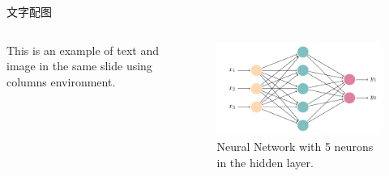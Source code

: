 \documentclass{ctexbeamer}
\begin{document}
\begin{frame}{文字配图}
  \begin{columns}
    \centering
    This is an example of text and image in the same slide using columns environment.
    \begin{figure}
      \centering
      \includegraphics[width=\textwidth]{neural-networks.pdf}
      \caption{Neural Network with 5 neurons in the hidden layer. }
    \end{figure}
  \end{columns}
\end{frame}
\end{document}
